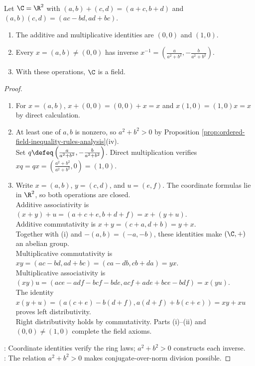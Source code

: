 \begin{theorem} \label{thm:complex-numbers-form-field} \\
Let $\C=\R^2$ with $(a,b)+(c,d)=(a+c,b+d)$ and $(a,b)(c,d)=(ac-bd,ad+bc)$.
\begin{enumerate}[label=(\roman*)]
\setlength{\itemsep}{0pt}
\item The additive and multiplicative identities are $(0,0)$ and $(1,0)$.
\item Every $x=(a,b)\neq(0,0)$ has inverse $x^{-1}=\left(\frac{a}{a^2+b^2},-\frac{b}{a^2+b^2}\right)$.
\item With these operations, $\C$ is a field.
\end{enumerate}
\begin{proof}
\begin{enumerate}[label=(\roman*)]
\setlength{\itemsep}{0pt}
\item For $x=(a,b)$, $x+(0,0)=(0,0)+x=x$ and $x(1,0)=(1,0)x=x$ by direct calculation.
\item At least one of $a,b$ is nonzero, so $a^2+b^2>0$ by Proposition \ref{prop:ordered-field-inequality-rules-analysis}(iv).\\
Set $q\defeq\left(\frac{a}{a^2+b^2},-\frac{b}{a^2+b^2}\right)$. Direct multiplication verifies $xq=qx=\left(\frac{a^2+b^2}{a^2+b^2},0\right)=(1,0)$.
\item Write $x=(a,b)$, $y=(c,d)$, and $u=(e,f)$. The coordinate formulas lie in $\R^2$, so both operations are closed.\\
Additive associativity is $(x+y)+u=(a+c+e,b+d+f)=x+(y+u)$.\\
Additive commutativity is $x+y=(c+a,d+b)=y+x$.\\
Together with (i) and $-(a,b)=(-a,-b)$, these identities make $(\C,+)$ an abelian group.\\
Multiplicative commutativity is $xy=(ac-bd,ad+bc)=(ca-db,cb+da)=yx$.\\
Multiplicative associativity is $(xy)u=(ace-adf-bcf-bde,acf+ade+bce-bdf)=x(yu)$.\\
The identity $x(y+u)=(a(c+e)-b(d+f),a(d+f)+b(c+e))=xy+xu$ proves left distributivity.\\
Right distributivity holds by commutativity. Parts (i)--(ii) and $(0,0)\neq(1,0)$ complete the field axioms.
\end{enumerate}
: Coordinate identities verify the ring laws; $a^2+b^2>0$ constructs each inverse.\\
: The relation $a^2+b^2>0$ makes conjugate-over-norm division possible.
\end{proof}
\end{theorem}

